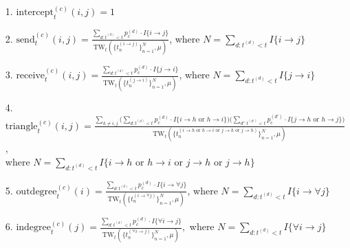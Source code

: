 \documentclass[a4paper]{article}
\begin{document}
 \begin{itemize}
 	\item [1.] $\mbox{intercept}^{(c)}_t(i, j) = 1$
 	\item [2.]  $\mbox{send}^{(c)}_t(i, j)= \frac{\sum\limits_{d: t^{(d)}<t}p_c^{(d)}\cdot I\{i\rightarrow j\}}{\mbox{TW}_t(\{t_n^{(i\rightarrow j)}\}_{n=1}^N, \mu) }$, where $N = \sum\limits_{d: t^{(d)}<t} I\{i\rightarrow j\}$
 	\item [3.] $\mbox{receive}^{(c)}_t(i, j)=\frac{\sum\limits_{d: t^{(d)}<t}p_c^{(d)}\cdot I\{j\rightarrow i\}}{\mbox{TW}_t(\{t_n^{(j\rightarrow i)}\}_{n=1}^N, \mu) }$, where $N = \sum\limits_{d: t^{(d)}<t} I\{j\rightarrow i\}$
 	\item [4.] $\mbox{triangle}^{(c)}_t(i, j)=\frac{\sum\limits_{h \neq i, j}\Big(\sum\limits_{d: t^{(d)}<t}p_c^{(d)}\cdot I\{i\rightarrow h \mbox{ or } h\rightarrow i\}\Big)\Big(\sum\limits_{d': t^{(d')}<t}p_c^{(d')}\cdot I\{j\rightarrow h \mbox{ or } h\rightarrow j\}\Big)}{\mbox{TW}_t(\{t_n^{(i\rightarrow h \mbox{ or } h\rightarrow i \mbox{ or } j\rightarrow h \mbox{ or } j\rightarrow h)}\}_{n=1}^N, \mu) }$, \\where $N = \sum\limits_{d: t^{(d)}<t} I\{i\rightarrow h \mbox{ or } h\rightarrow i \mbox{ or } j\rightarrow h \mbox{ or } j\rightarrow h\}$
 	\item [5.]  $\mbox{outdegree}^{(c)}_t(i)=\frac{\sum\limits_{d: t^{(d)}<t}p_c^{(d)}\cdot I\{i\rightarrow \forall j\}}{\mbox{TW}_t(\{t_n^{(i\rightarrow \forall j)}\}_{n=1}^N, \mu) }$, where $N = \sum\limits_{d: t^{(d)}<t} I\{i\rightarrow \forall j\}$
 	\item [6.] $\mbox{indegree}^{(c)}_t(j)=\frac{\sum\limits_{d: t^{(d)}<t}p_c^{(d)}\cdot I\{\forall i\rightarrow j\}}{\mbox{TW}_t(\{t_n^{(\forall i\rightarrow  j)}\}_{n=1}^N, \mu)}, $ where $N = \sum\limits_{d: t^{(d)}<t} I\{\forall i\rightarrow j\}$
 \end{itemize}
 \fi
\end{document}
